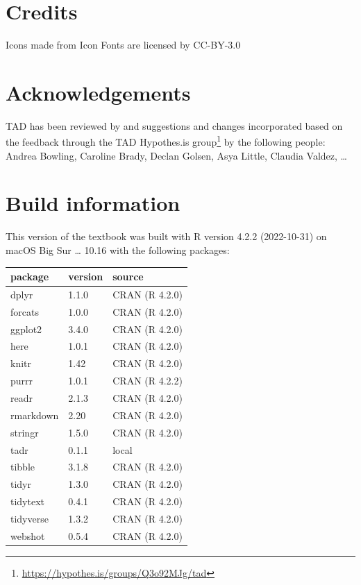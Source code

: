 \documentclass[
  letterpaper,
]{scrbook}
\DeclareRobustCommand{\href}[2]{#2\footnote{\url{#1}}}
\begin{document}
\hypertarget{credits}{%
\section*{Credits}\label{credits}}


Icons made from Icon Fonts are licensed by CC-BY-3.0

\hypertarget{acknowledgements}{%
\section*{Acknowledgements}\label{acknowledgements}}


TAD has been reviewed by and suggestions and changes incorporated based
on the feedback through
\href{https://hypothes.is/groups/Q3o92MJg/tad}{the TAD Hypothes.is
group} by the following people: Andrea Bowling, Caroline Brady, Declan
Golsen, Asya Little, Claudia Valdez, \ldots{}

\hypertarget{build-information}{%
\section*{Build information}\label{build-information}}


This version of the textbook was built with R version 4.2.2 (2022-10-31)
on macOS Big Sur \ldots{} 10.16 with the following packages:

\begin{longtable}[]{@{}lll@{}}
\toprule()
package & version & source \\
\midrule()
\endhead
dplyr & 1.1.0 & CRAN (R 4.2.0) \\
forcats & 1.0.0 & CRAN (R 4.2.0) \\
ggplot2 & 3.4.0 & CRAN (R 4.2.0) \\
here & 1.0.1 & CRAN (R 4.2.0) \\
knitr & 1.42 & CRAN (R 4.2.0) \\
purrr & 1.0.1 & CRAN (R 4.2.2) \\
readr & 2.1.3 & CRAN (R 4.2.0) \\
rmarkdown & 2.20 & CRAN (R 4.2.0) \\
stringr & 1.5.0 & CRAN (R 4.2.0) \\
tadr & 0.1.1 & local \\
tibble & 3.1.8 & CRAN (R 4.2.0) \\
tidyr & 1.3.0 & CRAN (R 4.2.0) \\
tidytext & 0.4.1 & CRAN (R 4.2.0) \\
tidyverse & 1.3.2 & CRAN (R 4.2.0) \\
webshot & 0.5.4 & CRAN (R 4.2.0) \\
\bottomrule()
\end{longtable}
\end{document}
